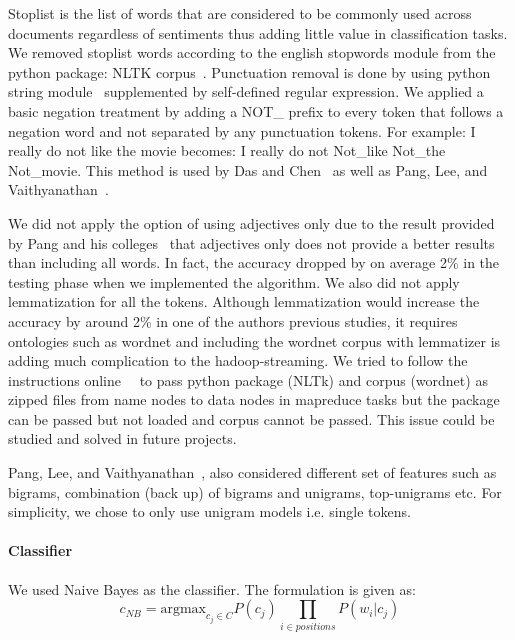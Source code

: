 Stoplist is the list of words that are considered to be commonly used across 
documents regardless of sentiments thus adding little value in classification 
tasks. We removed stoplist words according to the english stopwords 
module from the python package: NLTK 
corpus~\cite{hid-sp18-405-sentiment-stopworddoc}. Punctuation removal is 
done by using python string 
module~\cite{hid-sp18-405-sentiment-punctuationdoc} supplemented by 
self-defined regular expression. We applied a basic negation treatment by 
adding a NOT\_ prefix to every token that follows a negation word and not 
separated by any punctuation tokens. For example: I really do not like the 
movie becomes: I really do not Not\_like Not\_the Not\_movie. This method is 
used by Das and Chen~\cite{hid-sp18-405-sentiment-das2001yahoo} as well 
as Pang, Lee, and 
Vaithyanathan~\cite{hid-sp18-405-sentiment-pang2002thumbs}. 

We did not apply the option of using adjectives only due to the result 
provided by Pang and his 
colleges~\cite{hid-sp18-405-sentiment-pang2004asentimental} that  
adjectives only does not provide a better results than including all words. In 
fact, the accuracy dropped by on average 2\% in the testing phase when we 
implemented the algorithm. We also did not apply lemmatization for all the 
tokens. Although lemmatization would increase the accuracy by around 2\% 
in one of the authors previous studies, it requires ontologies such as 
wordnet and including the wordnet corpus with lemmatizer is adding much 
complication to the hadoop-streaming. We tried to follow the instructions 
online~\cite{hid-sp18-405-hadoopstreaming-nltk}~\cite{hid-sp18-405-hadoopstreaming-corpus}
 to pass python package (NLTk) and corpus (wordnet) as zipped files from 
name nodes to data nodes in mapreduce tasks but the package can be 
passed but not loaded and corpus cannot be passed. This issue could be 
studied and solved in future projects. 

Pang, Lee, and 
Vaithyanathan~\cite{hid-sp18-405-sentiment-pang2002thumbs}, also 
considered different set of 
features such as bigrams, combination (back up) of bigrams and unigrams, 
top-unigrams etc. For simplicity, we chose to only use unigram models i.e. 
single tokens. 

\paragraph{Classifier}
We  used Naive Bayes as the classifier. The formulation is given as:
\begin{equation*}
c_{NB}=\text{argmax}_{c_j \in C} P(c_j) \prod_{i \in positions} P(w_i|c_j)
\end{equation*}

